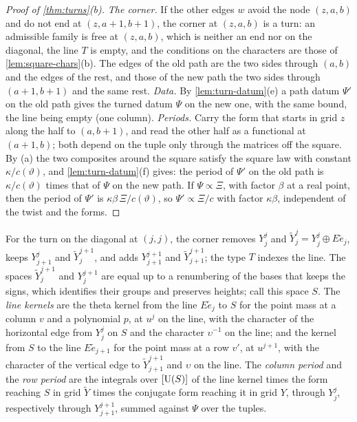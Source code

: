 \begin{proof}[Proof of \cref{thm:turns}(b)]
\emph{The corner.} If the other edges $w$ avoid the node $(z,a,b)$ and do not end at $(z,a+1,b+1)$, the corner at $(z,a,b)$ is a turn: an admissible family is free at $(z,a,b)$, which is neither an end nor on the diagonal, the line $T$ is
empty, and the conditions on the characters are those of \cref{lem:square-chars}(b). The edges of the old path are the two sides through $(a,b)$ and the edges of the rest, and those of the new path the two sides through $(a+1,b+1)$ and
the same rest. \emph{Data.} By \cref{lem:turn-datum}(e) a path datum $\Psi'$ on the old path gives the turned datum $\Psi$ on the new one, with the same bound, the line being empty (one column). \emph{Periods.} Carry the form that
starts in grid $z$ along the half to $(a,b+1)$, and read the other half as a functional at $(a+1,b)$; both depend on the tuple only through the matrices off the square. By (a) the two composites around the square satisfy the
square law with constant $\kappa/c(\vartheta)$, and \cref{lem:turn-datum}(f) gives: the period of $\Psi'$ on the old path is $\kappa/c(\vartheta)$ times that of $\Psi$ on the new path. If $\Psi\propto\Xi$, with factor $\beta$ at a real point,
then the period of $\Psi'$ is $\kappa\beta\,\Xi/c(\vartheta)$, so $\Psi'\propto\Xi/c$ with factor $\kappa\beta$, independent of the twist and the forms.
\end{proof}

For the turn on the diagonal at $(j,j)$, the corner removes $Y^j_j$ and $\tilde Y^j_j=Y^j_j\oplus E\tilde e_j$, keeps $Y^j_{j+1}$ and $\tilde Y^{j+1}_j$, and adds $Y^{j+1}_{j+1}$ and $\tilde Y^{j+1}_{j+1}$; the type $T$ indexes the line. The spaces $\tilde Y^{j+1}_j$ and
$Y^{j+1}_j$ are equal up to a renumbering of the bases that keeps the signs, which identifies their groups and preserves heights; call this space $S$. The \emph{line kernels} are the theta kernel from the line $E\tilde e_j$ to $S$
for the point mass at a column $v$ and a polynomial $p$, at $u^j$ on the line, with the character of the horizontal edge from $Y^j_j$ on $S$ and the character $\upsilon^{-1}$ on the line; and the kernel from $S$ to the line $E\tilde e_{j+1}$
for the point mass at a row $v'$, at $u^{j+1}$, with the character of the vertical edge to $\tilde Y^{j+1}_{j+1}$ and $\upsilon$ on the line. The \emph{column period} and the \emph{row period} are the integrals over $[\operatorname{U}(S)]$ of the line kernel
times the form reaching $S$ in grid $\tilde Y$ times the conjugate form reaching it in grid $Y$, through $Y^j_j$, respectively through $Y^{j+1}_{j+1}$, summed against $\Psi$ over the tuples.

